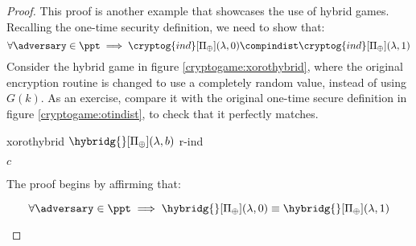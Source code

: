 \begin{proof}
    This proof is another example that showcases the use of hybrid games. Recalling the one-time security definition, we need to show that:
    \[
        \forall \adversary \in \ppt \implies \cryptog{ind}[\Pi_\xor](\lambda, 0) \compindist \cryptog{ind}[\Pi_\xor](\lambda, 1)
    \]
    Consider the hybrid game in figure \ref{cryptogame:xorothybrid}, where the original encryption routine is changed to use a completely random value, instead of using $G(k)$\footnotemark. As an exercise, compare it with the original one-time secure definition in figure \ref{cryptogame:otindist}, to check that it perfectly matches.


    \begin{cryptogame}
        {xorothybrid}
        {$\hybridg{}[\Pi_\xor](\lambda, b)$}
        {r-ind}


        {$c$}{}

        \cseqdelay

        
    \end{cryptogame}

    The proof begins by affirming that:
    \begin{claim}
        \[
            \forall \adversary \in \ppt \implies \hybridg{}[\Pi_\xor](\lambda, 0) \equiv \hybridg{}[\Pi_\xor](\lambda, 1)
        \]
    \end{claim}


\end{proof}
